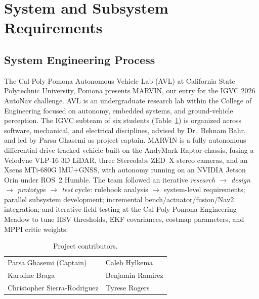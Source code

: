 \documentclass[12pt, letterpaper]{article}
\newcommand{\robotname}{MARVIN}
\newcommand{\teamname}{Cal Poly Pomona Autonomous Vehicle Lab}
\newcommand{\university}{California State Polytechnic University, Pomona}
\begin{document}
\thispagestyle{fancy}
\tableofcontents
\newpage
{}
\setcounter{page}{1}

\section{System and Subsystem Requirements}
\label{sec:requirements}

\subsection{System Engineering Process}

The \teamname{} (AVL) at \university{} presents \robotname{}, our entry for the IGVC
2026 AutoNav challenge. AVL is an undergraduate research lab within the College of
Engineering focused on autonomy, embedded systems, and ground-vehicle perception. The
IGVC subteam of six students (Table~\ref{tab:team}) is organized across software, mechanical, and
electrical disciplines, advised by Dr.~Behnam Bahr, and led by Parsa Ghasemi as project
captain. \robotname{} is a fully autonomous differential-drive tracked vehicle built on
the AndyMark Raptor chassis, fusing a Velodyne VLP-16 3D LiDAR, three Stereolabs ZED~X
stereo cameras, and an Xsens MTi-680G IMU+GNSS, with autonomy running on an NVIDIA
Jetson Orin under ROS~2 Humble. The team followed an iterative \textit{research
$\rightarrow$ design $\rightarrow$ prototype $\rightarrow$ test} cycle: rulebook
analysis $\to$ system-level requirements; parallel subsystem development; incremental
bench/actuator/fusion/Nav2 integration; and iterative field testing at the
Cal Poly Pomona Engineering Meadow to tune HSV thresholds, EKF covariances, costmap
parameters, and MPPI critic weights.

\begin{table}[H]
    \centering
    \footnotesize
    \caption{Project contributors.}
    \label{tab:team}
    \begin{tabular}{ll}
        \toprule
        Parsa Ghasemi (Captain)         & Caleb Hylkema    \\
        Karoline Braga                  & Benjamin Ramirez \\
        Christopher Sierra-Rodriguez    & Tyrese Rogers    \\
        \bottomrule
    \end{tabular}
\end{table}
\end{document}
